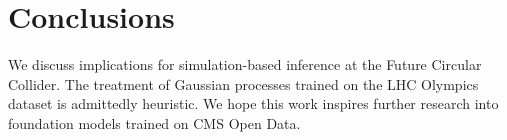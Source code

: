 \section{Conclusions}\label{sec:conclusions}

We discuss implications for simulation-based inference at the Future
Circular Collider. The treatment of Gaussian processes trained on the
LHC Olympics dataset is admittedly heuristic. We hope this work inspires
further research into foundation models trained on CMS Open Data.

